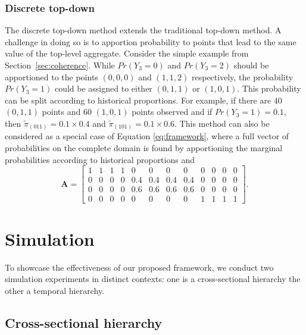 \documentclass[a4paper,review,11pt,authoryear]{elsarticle}
\theoremstyle{definition}
\begin{document}
    \subsubsection*{\textbf{Discrete top-down}}

    The discrete top-down method extends the traditional top-down method. A challenge in doing so is to apportion probability to points that lead to the same value of the top-level aggregate. Consider the simple example from Section~\ref{sec:coherence}. While $Pr(Y_3=0)$ and $Pr(Y_3=2)$ should be apportioned to the points $(0,0,0)$ and $(1,1,2)$ respectively, the probability $Pr(Y_3=1)$ could be assigned to either $(0,1,1)$ or $(1,0,1)$. This probability can be split according to historical proportions. For example, if there are $40$ $(0, 1, 1)$ points and $60$ $(1, 0, 1) $ points observed and if  $Pr(Y_3=1) = 0.1$, then $\tilde \pi_{(011)} = 0.1\times 0.4$ and $\tilde \pi_{(101)} = 0.1\times 0.6$.
    This method can also be considered as a special case of Equation \eqref{eq:framework}, where a full vector of probabilities on the complete domain is found by apportioning the marginal probabilities according to historical proportions and
    \[
    \mathbf{A} = \left[\begin{matrix}
      1 & 1 & 1 & 1 & 0 & 0 & 0 & 0 & 0 & 0 & 0 & 0 \\
      0 & 0 & 0 & 0 & 0.4 & 0.4 & 0.4 & 0.4 & 0 & 0 & 0 & 0 \\
      0 & 0 & 0 & 0 & 0.6 & 0.6 & 0.6 & 0.6 & 0 & 0 & 0 & 0 \\
      0 & 0 & 0 & 0 & 0 & 0 & 0 & 0 & 1 & 1 & 1 & 1
    \end{matrix}\right].
    \]

\section{Simulation}
\label{sec:simulation}

To showcase the effectiveness of our proposed framework, we conduct two simulation experiments in distinct contexts: one is a cross-sectional hierarchy the other a temporal hierarchy.

  \subsection{Cross-sectional hierarchy}
  \label{sec:cross-sectional_simu}
\end{document}
